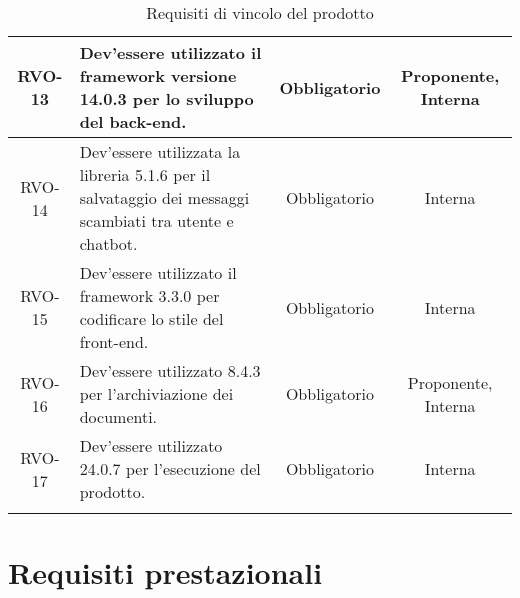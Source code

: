 \begin{xltabular}{\textwidth}{| c | X | c | c |}
    \hline
    RVO-13 & Dev'essere utilizzato il framework  versione 14.0.3 per lo sviluppo del back-end. & Obbligatorio & Proponente, Interna \\
    \hline
    RVO-14 & Dev'essere utilizzata la libreria  5.1.6 per il salvataggio dei messaggi scambiati tra utente e chatbot. & Obbligatorio & Interna \\
    \hline
    RVO-15 & Dev'essere utilizzato il framework  3.3.0 per codificare lo stile del front-end. & Obbligatorio & Interna \\
    \hline
    RVO-16 & Dev'essere utilizzato  8.4.3 per l'archiviazione dei documenti. & Obbligatorio & Proponente, Interna \\
    \hline
    RVO-17 & Dev'essere utilizzato  24.0.7 per l'esecuzione del prodotto. & Obbligatorio & Interna \\
    \hline
     \caption{Requisiti di vincolo del prodotto}
    \label{tab:reqvin}
\end{xltabular}
\endgroup

\section{Requisiti prestazionali}


